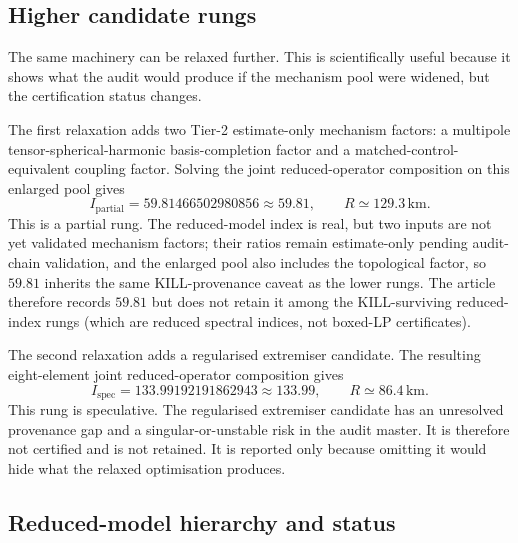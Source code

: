 \documentclass[11pt,a4paper]{article}
\begin{document}
\subsection{Higher candidate rungs}

The same machinery can be relaxed further. This is scientifically useful because it shows what the audit would produce if the mechanism pool were widened, but the certification status changes.

The first relaxation adds two Tier-2 estimate-only mechanism factors: a multipole tensor-spherical-harmonic basis-completion factor and a matched-control-equivalent coupling factor. Solving the joint reduced-operator composition on this enlarged pool gives
\[
I_{\mathrm{partial}} = 59.81466502980856 \approx 59.81, \qquad R \simeq 129.3\,\mathrm{km}.
\]
This is a partial rung. The reduced-model index is real, but two inputs are not yet validated mechanism factors; their ratios remain estimate-only pending audit-chain validation, and the enlarged pool also includes the topological factor, so $59.81$ inherits the same KILL-provenance caveat as the lower rungs. The article therefore records $59.81$ but does not retain it among the KILL-surviving reduced-index rungs (which are reduced spectral indices, not boxed-LP certificates).

The second relaxation adds a regularised extremiser candidate. The resulting eight-element joint reduced-operator composition gives
\[
I_{\mathrm{spec}} = 133.99192191862943 \approx 133.99, \qquad R \simeq 86.4\,\mathrm{km}.
\]
This rung is speculative. The regularised extremiser candidate has an unresolved provenance gap and a singular-or-unstable risk in the audit master. It is therefore not certified and is not retained. It is reported only because omitting it would hide what the relaxed optimisation produces.

\subsection{Reduced-model hierarchy and status}
\end{document}
